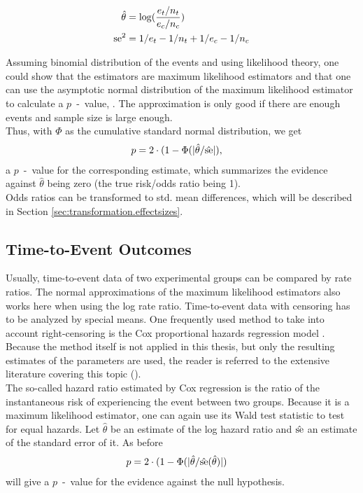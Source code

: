 \documentclass[11pt,a4paper,twoside]{book}\usepackage[]{graphicx}\usepackage[]{color}
\begin{document}
\begin{align}
\hat{\theta} &= \log(\frac{e_t/n_t}{e_c/n_c}) \label{eq:risk.ratio} \\
\operatorname{se}^2&= 1/e_t - 1/n_t + 1/e_c - 1/n_c \label{eq:risk.ratio.variance}
\end{align}

Assuming binomial distribution of the events and using likelihood theory, one could show that the estimators are maximum likelihood estimators and that one can use the asymptotic normal distribution of the maximum likelihood estimator to calculate a  $p$\hspace{0.4mm}~-~value, \eg \cite[98]{held2014}. The approximation is only good if there are enough events and sample size is large enough.\\
Thus, with $\Phi$ as the cumulative standard normal distribution, we get
\begin{align}
p &= 2\cdot(1-\Phi(|\hat{\theta}/\hat{\operatorname{se}}|), \nonumber
\end{align}
a  $p$\hspace{0.4mm}~-~value for the corresponding estimate, which summarizes the evidence against $\hat{\theta}$ being zero (\ie the true risk/odds ratio being 1). \\
Odds ratios can be transformed to std. mean differences, which will be described in Section \ref{sec:transformation.effectsizes}.

\subsection{Time-to-Event Outcomes}
Usually, time-to-event data of two experimental groups can be compared by rate ratios. The normal approximations of the maximum likelihood estimators also works here when using the log rate ratio.
Time-to-event data with censoring has to be analyzed by special means. One frequently used method to take into account right-censoring is the Cox proportional hazards regression model \citep{Cox}. Because the method itself is not applied in this thesis, but only the resulting estimates of the parameters are used, the reader is referred to the extensive literature covering this topic (\eg \citealp{Surv}). \\
The so-called hazard ratio estimated by Cox regression is the ratio of the instantaneous risk of experiencing the event between two groups. Because it is a maximum likelihood estimator, one can again use its Wald test statistic to test for equal hazards. Let $\hat{\theta}$ be an estimate of the log hazard ratio and $\hat{\operatorname{se}}$ an estimate of the standard error of it. As before
\begin{align}
p &= 2\cdot(1-\Phi(|\hat{\theta}/\hat{\operatorname{se}}(\hat{\theta})|) \nonumber
\end{align}
will give a  $p$\hspace{0.4mm}~-~value for the evidence against the null hypothesis.
\end{document}
